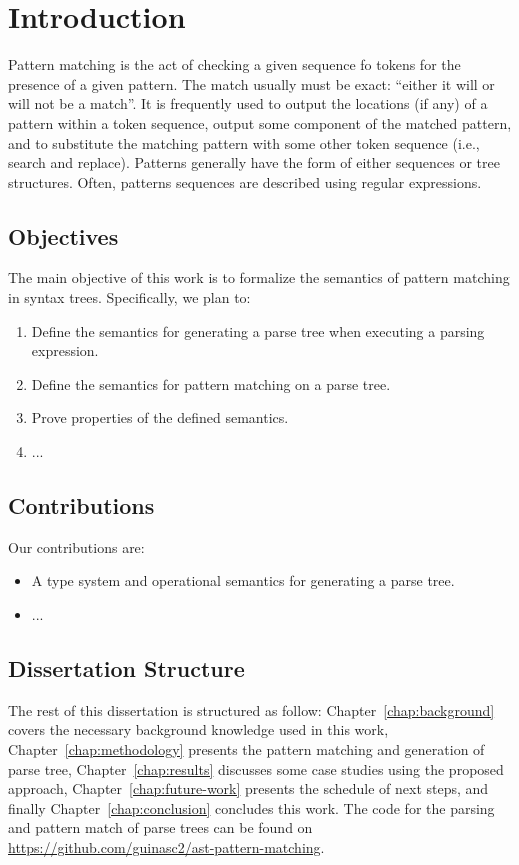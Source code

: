 \chapter{Introduction}\label{chap:intro}

Pattern matching is the act of checking a given sequence fo tokens for the presence
of a given pattern. The match usually must be exact: ``either it
will or will not be a match''. It is frequently used to output the locations (if any)
of a pattern within a token sequence, output some component of the matched pattern,
and to substitute the matching pattern with some other token sequence (i.e., search
and replace). Patterns generally have the form of either sequences or tree structures.
Often, patterns sequences are described using regular expressions.


\section{Objectives}\label{sec:objectives}

The main objective of this work is to formalize the semantics of pattern matching
in syntax trees. Specifically, we plan to:
\begin{enumerate}
    \item Define the semantics for generating a parse tree when executing a parsing expression.
    \item Define the semantics for pattern matching on a parse tree.
    \item Prove properties of the defined semantics.
    \item ...
\end{enumerate}

\section{Contributions}\label{sec:contributions}

Our contributions are:
\begin{itemize}
    \item A type system and operational semantics for generating a parse tree.
    \item ...
\end{itemize}

\section{Dissertation Structure}\label{sec:structure}

The rest of this dissertation is structured as follow: Chapter~\ref{chap:background}
covers the necessary background knowledge used in this work, Chapter~\ref{chap:methodology}
presents the pattern matching and generation of parse tree, Chapter~\ref{chap:results}
discusses some case studies using the proposed approach, Chapter~\ref{chap:future-work}
presents the schedule of next steps, and finally Chapter~\ref{chap:conclusion} concludes
this work.
The code for the parsing and pattern match of parse trees can be found on
\url{https://github.com/guinasc2/ast-pattern-matching}.

\cleardoublepage
